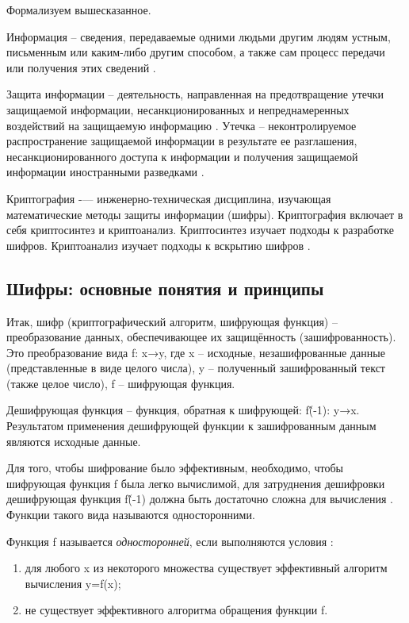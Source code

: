 Формализуем вышесказанное.

Информация – сведения, передаваемые одними людьми другим людям устным, письменным или каким-либо другим способом, а также сам процесс передачи или получения этих сведений \cite{src9}.

Защита информации – деятельность, направленная на предотвращение утечки защищаемой информации, несанкционированных и непреднамеренных воздействий на защищаемую информацию \cite{src10}. Утечка – неконтролируемое распространение защищаемой информации в результате ее разглашения, несанкционированного доступа к информации и получения защищаемой информации иностранными разведками \cite{src11}.

Криптография -— инженерно-техническая дисциплина, изучающая математические методы защиты информации (шифры). Криптография включает в себя криптосинтез и криптоанализ. Криптосинтез изучает подходы к разработке шифров. Криптоанализ изучает подходы к вскрытию шифров \cite{src8}.

\subsection{Шифры: основные понятия и принципы} %

Итак, шифр (криптографический алгоритм, шифрующая функция) – преобразование данных, обеспечивающее их защищённость (зашифрованность). Это преобразование вида f: x→y, где x – исходные, незашифрованные данные (представленные в виде целого числа), y – полученный зашифрованный текст (также целое число), f – шифрующая функция.

Дешифрующая функция – функция, обратная к шифрующей: f\^(-1): y→x. Результатом применения дешифрующей функции к зашифрованным данным являются исходные данные.

Для того, чтобы шифрование было эффективным, необходимо, чтобы шифрующая функция f была легко вычислимой, для затруднения дешифровки дешифрующая функция f\^(-1) должна быть достаточно сложна для вычисления \cite{src12}. Функции такого вида называются односторонними.

Функция f называется \textit{односторонней}, если выполняются условия \cite{src12}:
\begin{enumerate}
	\item для любого x из некоторого множества существует эффективный алгоритм вычисления y=f(x);
	\item не существует эффективного алгоритма обращения функции f.
\end{enumerate}  

